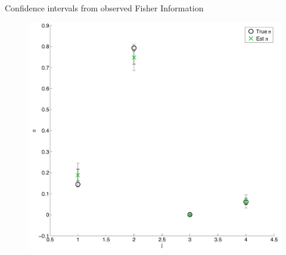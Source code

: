 \documentclass{beamer}
\begin{document}
\begin{frame}{Confidence intervals from observed Fisher Information}
	
	\begin{figure}
			\begin{center}
				\includegraphics[scale=0.3]{2x2eb.pdf}
			\end{center}
	\end{figure}
	
\end{frame}
\end{document}
